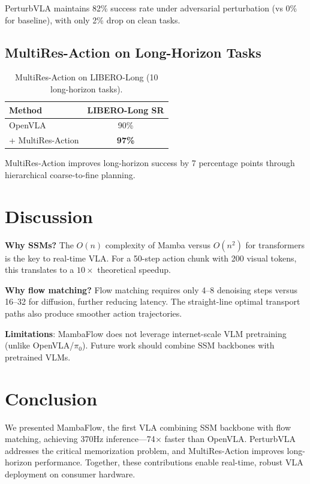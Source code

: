 \documentclass[11pt]{article}
\begin{document}
PerturbVLA maintains 82\% success rate under adversarial perturbation (vs 0\% for baseline), with only 2\% drop on clean tasks.

\subsection{MultiRes-Action on Long-Horizon Tasks}

\begin{table}[h]
\centering
\caption{MultiRes-Action on LIBERO-Long (10 long-horizon tasks).}
\label{tab:multires}
\begin{tabular}{lc}
\toprule
Method & LIBERO-Long SR \\
\midrule
OpenVLA & 90\% \\
+ MultiRes-Action & \textbf{97\%} \\
\bottomrule
\end{tabular}
\end{table}

MultiRes-Action improves long-horizon success by 7 percentage points through hierarchical coarse-to-fine planning.

\section{Discussion}

\textbf{Why SSMs?} The $O(n)$ complexity of Mamba versus $O(n^2)$ for transformers is the key to real-time VLA. For a 50-step action chunk with 200 visual tokens, this translates to a $10\times$ theoretical speedup.

\textbf{Why flow matching?} Flow matching requires only 4--8 denoising steps versus 16--32 for diffusion, further reducing latency. The straight-line optimal transport paths also produce smoother action trajectories.

\textbf{Limitations}: MambaFlow does not leverage internet-scale VLM pretraining (unlike OpenVLA/$\pi_0$). Future work should combine SSM backbones with pretrained VLMs.

\section{Conclusion}

We presented MambaFlow, the first VLA combining SSM backbone with flow matching, achieving 370Hz inference---74$\times$ faster than OpenVLA. PerturbVLA addresses the critical memorization problem, and MultiRes-Action improves long-horizon performance. Together, these contributions enable real-time, robust VLA deployment on consumer hardware.



\end{document}
